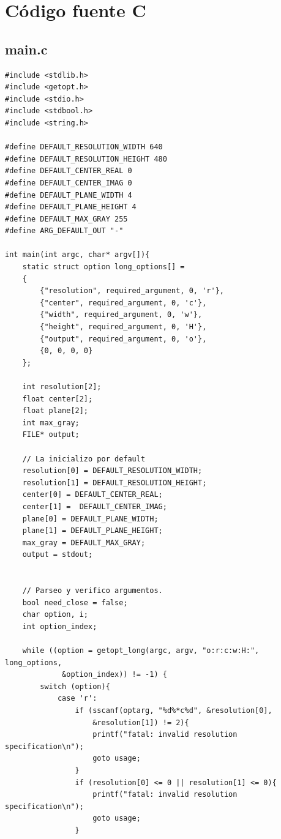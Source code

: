 \documentclass[a4paper,10pt]{article}
\begin{document}
\section{C\'odigo fuente C}

\subsection{main.c}

\begin{verbatim}
#include <stdlib.h>
#include <getopt.h>
#include <stdio.h>
#include <stdbool.h>
#include <string.h>

#define DEFAULT_RESOLUTION_WIDTH 640
#define DEFAULT_RESOLUTION_HEIGHT 480
#define DEFAULT_CENTER_REAL 0
#define DEFAULT_CENTER_IMAG 0
#define DEFAULT_PLANE_WIDTH 4
#define DEFAULT_PLANE_HEIGHT 4
#define DEFAULT_MAX_GRAY 255
#define ARG_DEFAULT_OUT "-"

int main(int argc, char* argv[]){
    static struct option long_options[] =
    {
        {"resolution", required_argument, 0, 'r'},
        {"center", required_argument, 0, 'c'},
        {"width", required_argument, 0, 'w'},
        {"height", required_argument, 0, 'H'},
        {"output", required_argument, 0, 'o'},
        {0, 0, 0, 0}
    };

    int resolution[2];
    float center[2];
    float plane[2];
	int max_gray;
    FILE* output;
	
	// La inicializo por default
	resolution[0] = DEFAULT_RESOLUTION_WIDTH;
    resolution[1] = DEFAULT_RESOLUTION_HEIGHT;
    center[0] = DEFAULT_CENTER_REAL;
    center[1] =  DEFAULT_CENTER_IMAG;
    plane[0] = DEFAULT_PLANE_WIDTH;
    plane[1] = DEFAULT_PLANE_HEIGHT;
	max_gray = DEFAULT_MAX_GRAY;
    output = stdout;
	

	// Parseo y verifico argumentos.
    bool need_close = false;
    char option, i;
    int option_index;

    while ((option = getopt_long(argc, argv, "o:r:c:w:H:", long_options,
    		 &option_index)) != -1) {
        switch (option){
            case 'r':
                if (sscanf(optarg, "%d%*c%d", &resolution[0], 
                	&resolution[1]) != 2){
                    printf("fatal: invalid resolution specification\n");
                    goto usage;
                }
                if (resolution[0] <= 0 || resolution[1] <= 0){
                    printf("fatal: invalid resolution specification\n");
                    goto usage;
                }


\end{verbatim}
\end{document}
